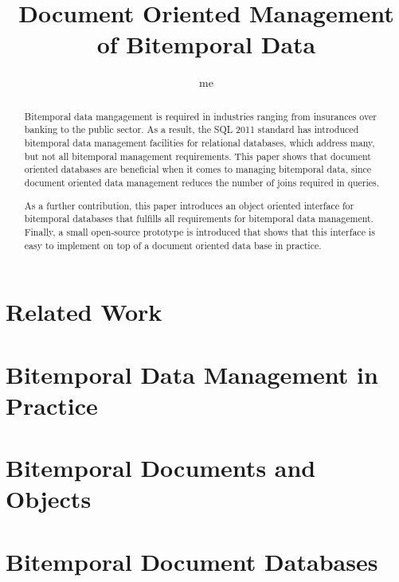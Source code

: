 \documentclass{article}
\title{Document Oriented Management of Bitemporal Data}
\author{me}
\begin{document}
\maketitle

\begin{abstract}
  Bitemporal data mangagement is required in industries ranging from insurances
  over banking to the public sector. As a result, the SQL 2011 standard has
  introduced bitemporal data management facilities for relational databases,
  which address many, but not all bitemporal management requirements. This
  paper shows that document oriented databases are beneficial when it comes to
  managing bitemporal data, since document oriented data management reduces the
  number of joins required in queries.
 
  As a further contribution, this paper introduces an object oriented interface
  for bitemporal databases that fulfills all requirements for bitemporal data
  management. Finally, a small open-source prototype is introduced that shows
  that this interface is easy to implement on top of a document oriented data
  base in practice.
\end{abstract}

\section{Related Work}



\section{Bitemporal Data Management in Practice}

\section{Bitemporal Documents and Objects}

\section{Bitemporal Document Databases}
\end{document}
